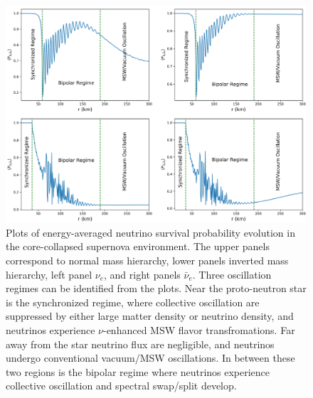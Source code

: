 \documentclass[11pt, oneside]{article}   	%
\begin{document}
\begin{figure}[t]
\begin{center}
\includegraphics[width=\linewidth]{flavor_evo_std.png}
\caption{Plots of energy-averaged neutrino survival probability evolution in the core-collapsed supernova environment. The upper panels correspond to normal mass hierarchy, lower panels inverted mass hierarchy, left panel $\nu_e$, and right panels $\bar \nu_e$. Three oscillation regimes can be identified from the plots. Near the proto-neutron star is the synchronized regime, where collective oscillation are suppressed by either large matter density or neutrino density, and neutrinos experience $\nu$-enhanced MSW flavor transfromations. Far away from the star neutrino flux are negligible, and neutrinos undergo conventional vacuum/MSW oscillations. In between these two regions is the bipolar regime where neutrinos experience collective oscillation and spectral swap/split develop.} 
\label{fig:fe_std}
\end{center}
\end{figure}
\end{document}
